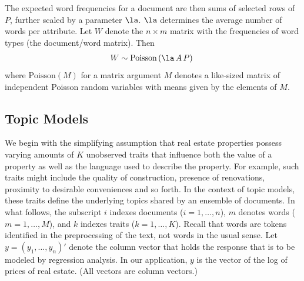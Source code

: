 \documentclass[10pt]{article}
\begin{document}
The expected word frequencies for a document are then sums of selected rows of $P$, further scaled by a parameter $\la$.  $\la$ determines the average number of words per attribute.  Let $W$ denote the $n \times m$ matrix with the frequencies of word types (the document/word matrix).  Then
\begin{equation}
	W \sim \mbox{Poisson} \left(\la \, A \, P \right) \;
\end{equation}
where $\mbox{Poisson}(M)$ for a matrix argument $M$ denotes a like-sized matrix of independent Poisson random variables with means given by the elements of $M$.




\subsection {Topic Models}  %

 We begin with the simplifying assumption that real estate properties possess
 varying amounts of $K$ unobserved traits that influence both the value of
 a property as well as the language used to describe the property.  For example,
 such traits might include the quality of construction, presence of renovations,
 proximity to desirable conveniences and so forth.  In the context of topic models, these traits define the underlying topics shared by an ensemble of documents.  In what follows, the subscript $i$ indexes documents ($i = 1,\ldots,n$), $m$ denotes words ($m=1,\ldots,M$), and $k$ indexes traits ($k = 1,\ldots,K$).  Recall that words are tokens identified in the preprocessing of the text, not words in the usual sense.   Let $y = (y_1,\ldots,y_n)'$ denote the column vector that holds the response that is to be modeled by regression analysis.    In our application, $y$ is the vector of the log of prices of real estate. (All vectors are column vectors.)
\end{document}
